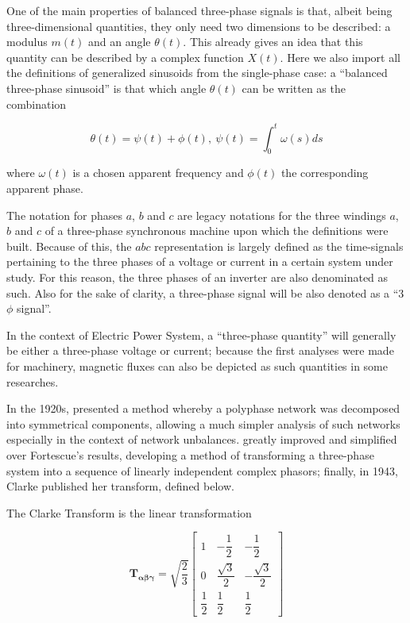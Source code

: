 	One of the main properties of balanced three-phase signals is that, albeit being three-dimensional quantities, they only need two dimensions to be described: a modulus $m(t)$ and an angle $\theta(t)$. This already gives an idea that this quantity can be described by a complex function $X(t)$. Here we also import all the definitions of generalized sinusoids from the single-phase case: a ``balanced three-phase sinusoid'' is that which angle $\theta(t)$ can be written as the combination

\begin{equation} \theta(t) = \psi(t) + \phi(t),\ \psi(t) = \int_0^t \omega(s)ds \end{equation}

	\noindent where $\omega(t)$ is a chosen apparent frequency and $\phi(t)$ the corresponding apparent phase.

	The notation for phases $a$, $b$ and $c$ are legacy notations for the three windings $a$, $b$ and $c$ of a three-phase synchronous machine upon which the definitions were built. Because of this, the $abc$ representation is largely defined as the time-signals pertaining to the three phases of a voltage or current in a certain system under study. For this reason, the three phases of an inverter are also denominated as such. Also for the sake of clarity, a three-phase signal will be also denoted as a ``3$\phi$ signal''.

	In the context of Electric Power System, a ``three-phase quantity'' will generally be either a three-phase voltage or current; because the first analyses were made for machinery, magnetic fluxes can also be depicted as such quantities in some researches.

	In the 1920s, \cite{Fortescue1918} presented a method whereby a polyphase network was decomposed into symmetrical components, allowing a much simpler analysis of such networks especially in the context of network unbalances. \cite{clarke1938problems} greatly improved and simplified over Fortescue's results, developing a method of transforming a three-phase system into a sequence of linearly independent complex phasors; finally, in 1943, Clarke published her transform, defined below.

\begin{definition}\label{def:clarke_transform} %
	The Clarke Transform is the linear transformation

\begin{equation}
\mathbf{T_{\alpha\beta\gamma}} = \sqrt{\dfrac{2}{3}}
\left[\begin{array}{ccc}
1 & -\dfrac{1}{2} & -\dfrac{1}{2} \\[5mm]
0 &  \dfrac{\sqrt{3}}{2} & -\dfrac{\sqrt{3}}{2} \\[5mm]
\dfrac{1}{2} & \dfrac{1}{2} & \dfrac{1}{2}
\end{array}\right]
\end{equation}

\end{definition} %

